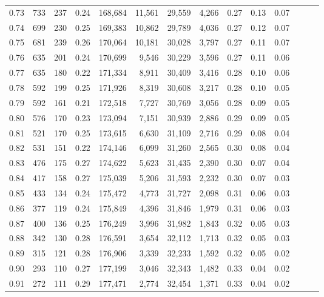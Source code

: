\begin{tabular}{rrrrrrrrrrrrrr}
0.73 &    733 &  237 &  0.24 &  168,684 &   11,561 &  29,559 &   4,266 &  0.27 &  0.13 &      0.07 \\
0.74 &    699 &  230 &  0.25 &  169,383 &   10,862 &  29,789 &   4,036 &  0.27 &  0.12 &      0.07 \\
0.75 &    681 &  239 &  0.26 &  170,064 &   10,181 &  30,028 &   3,797 &  0.27 &  0.11 &      0.07 \\
0.76 &    635 &  201 &  0.24 &  170,699 &    9,546 &  30,229 &   3,596 &  0.27 &  0.11 &      0.06 \\
0.77 &    635 &  180 &  0.22 &  171,334 &    8,911 &  30,409 &   3,416 &  0.28 &  0.10 &      0.06 \\
0.78 &    592 &  199 &  0.25 &  171,926 &    8,319 &  30,608 &   3,217 &  0.28 &  0.10 &      0.05 \\
0.79 &    592 &  161 &  0.21 &  172,518 &    7,727 &  30,769 &   3,056 &  0.28 &  0.09 &      0.05 \\
0.80 &    576 &  170 &  0.23 &  173,094 &    7,151 &  30,939 &   2,886 &  0.29 &  0.09 &      0.05 \\
0.81 &    521 &  170 &  0.25 &  173,615 &    6,630 &  31,109 &   2,716 &  0.29 &  0.08 &      0.04 \\
0.82 &    531 &  151 &  0.22 &  174,146 &    6,099 &  31,260 &   2,565 &  0.30 &  0.08 &      0.04 \\
0.83 &    476 &  175 &  0.27 &  174,622 &    5,623 &  31,435 &   2,390 &  0.30 &  0.07 &      0.04 \\
0.84 &    417 &  158 &  0.27 &  175,039 &    5,206 &  31,593 &   2,232 &  0.30 &  0.07 &      0.03 \\
0.85 &    433 &  134 &  0.24 &  175,472 &    4,773 &  31,727 &   2,098 &  0.31 &  0.06 &      0.03 \\
0.86 &    377 &  119 &  0.24 &  175,849 &    4,396 &  31,846 &   1,979 &  0.31 &  0.06 &      0.03 \\
0.87 &    400 &  136 &  0.25 &  176,249 &    3,996 &  31,982 &   1,843 &  0.32 &  0.05 &      0.03 \\
0.88 &    342 &  130 &  0.28 &  176,591 &    3,654 &  32,112 &   1,713 &  0.32 &  0.05 &      0.03 \\
0.89 &    315 &  121 &  0.28 &  176,906 &    3,339 &  32,233 &   1,592 &  0.32 &  0.05 &      0.02 \\
0.90 &    293 &  110 &  0.27 &  177,199 &    3,046 &  32,343 &   1,482 &  0.33 &  0.04 &      0.02 \\
0.91 &    272 &  111 &  0.29 &  177,471 &    2,774 &  32,454 &   1,371 &  0.33 &  0.04 &      0.02 \\

\end{tabular}
